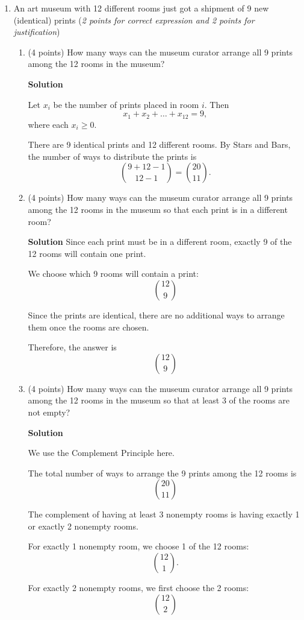 \documentclass[10pt,letterpaper,unboxed,cm]{article}
\begin{document}
\begin{enumerate}
\begin{enumerate}
By Stars and Bars, the number of solutions is
\[\binom{7+26-1}{26-1}=\boxed{\binom{32}{25}}\]

\end{enumerate}

\item
An art museum with 12 different rooms just got a shipment of 9 new (identical) prints (\emph{2 points for correct expression and 2 points for justification})
\begin{enumerate}
\item
(4 points)
How many ways can the museum curator arrange all 9 prints among the 12 rooms in the museum?

\textbf{Solution}

Let $x_i$ be the number of prints placed in room $i$. Then
\[x_1+x_2+\dots+x_{12}=9,\]
where each $x_i \geq 0$.

There are 9 identical prints and 12 different rooms. By Stars and Bars,
the number of ways to distribute the prints is
\[\binom{9+12-1}{12-1}=\boxed{\binom{20}{11}}.\]

\item
(4 points)
How many ways can the museum curator arrange all 9 prints among the 12 rooms in the museum so that each print is in a different room?

\textbf{Solution}
Since each print must be in a different room, exactly 9 of the 12 rooms
will contain one print.

We choose which 9 rooms will contain a print:
\[\binom{12}{9}\]

Since the prints are identical, there are no additional ways to arrange
them once the rooms are chosen.

Therefore, the answer is
\[\boxed{\binom{12}{9}}\]

\item
(4 points)
How many ways can the museum curator arrange all 9 prints among the 12 rooms in the museum so that at least 3 of the rooms are not empty?

\textbf{Solution}

We use the Complement Principle here.

The total number of ways to arrange the 9 prints among the 12 rooms is
\[\binom{20}{11}\]

The complement of having at least 3 nonempty rooms is having exactly
1 or exactly 2 nonempty rooms.

For exactly 1 nonempty room, we choose 1 of the 12 rooms:
\[\binom{12}{1}.\]

For exactly 2 nonempty rooms, we first choose the 2 rooms:
\[\binom{12}{2}\]


\end{enumerate}
\end{enumerate}
\end{document}
